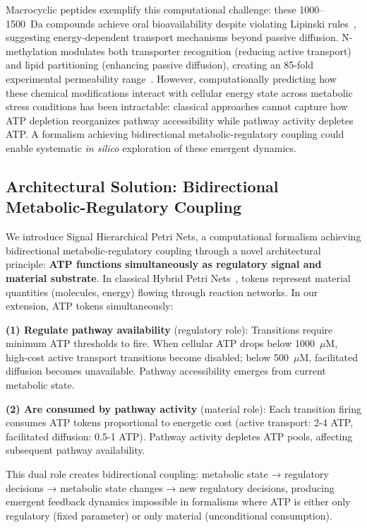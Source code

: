\documentclass[10pt,letterpaper]{article}
\begin{document}
Macrocyclic peptides exemplify this computational challenge: these 1000--1500~Da compounds achieve oral bioavailability despite violating Lipinski rules~\cite{Driggers2008,Doak2014}, suggesting energy-dependent transport mechanisms beyond passive diffusion. N-methylation modulates both transporter recognition (reducing active transport) and lipid partitioning (enhancing passive diffusion), creating an 85-fold experimental permeability range~\cite{Doak2014}. However, computationally predicting how these chemical modifications interact with cellular energy state across metabolic stress conditions has been intractable: classical approaches cannot capture how ATP depletion reorganizes pathway accessibility while pathway activity depletes ATP. A formalism achieving bidirectional metabolic-regulatory coupling could enable systematic \textit{in silico} exploration of these emergent dynamics.

\subsection{Architectural Solution: Bidirectional Metabolic-Regulatory Coupling}

We introduce Signal Hierarchical Petri Nets, a computational formalism achieving bidirectional metabolic-regulatory coupling through a novel architectural principle: \textbf{ATP functions simultaneously as regulatory signal and material substrate}. In classical Hybrid Petri Nets~\cite{Petri1962,Murata1989,David1992}, tokens represent material quantities (molecules, energy) flowing through reaction networks. In our extension, ATP tokens simultaneously:

\textbf{(1) Regulate pathway availability} (regulatory role): Transitions require minimum ATP thresholds to fire. When cellular ATP drops below 1000~$\mu$M, high-cost active transport transitions become disabled; below 500~$\mu$M, facilitated diffusion becomes unavailable. Pathway accessibility emerges from current metabolic state.

\textbf{(2) Are consumed by pathway activity} (material role): Each transition firing consumes ATP tokens proportional to energetic cost (active transport: 2-4 ATP, facilitated diffusion: 0.5-1 ATP). Pathway activity depletes ATP pools, affecting subsequent pathway availability.

This dual role creates bidirectional coupling: metabolic state → regulatory decisions → metabolic state changes → new regulatory decisions, producing emergent feedback dynamics impossible in formalisms where ATP is either only regulatory (fixed parameter) or only material (unconditional consumption).
\end{document}

